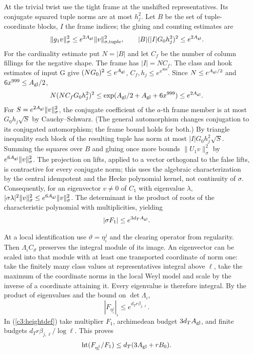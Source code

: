 At the trivial twist use the tight frame at the unshifted
representatives. Its conjugate squared tuple norms are at most
$h_j^2$. Let $B$ be the set of tuple-coordinate blocks, $I$ the
frame indices; the gluing and counting estimates are
\[
 \|g_1 v\|_\sigma^2\le e^{2A_{\rm gl}}\|v\|_{\sigma,\mathrm{tuple}}^2,\qquad
 |B|(|I|G_0 h_j^2)^2\le e^{2A_{\rm gl}}.
\]
For the cardinality estimate put $N=|B|$ and let $C_f$ be the
number of column fillings for the negative shape. The frame has
$|I|=NC_f$. The class and hook estimates of input G give
$(NG_0)^2\le e^{A_{\rm gl}}$, $C_f,h_j\le e^{x^{999}}$. Since
$N\le e^{A_{\rm gl}/2}$ and $6x^{999}\le A_{\rm gl}/2$,
\[
 N(NC_fG_0h_j^2)^2\le
    \exp(A_{\rm gl}/2+A_{\rm gl}+6x^{999})\le e^{2A_{\rm gl}}.
\]
For $S=e^{2A_{\rm gl}}\|v\|_\sigma^2$, the conjugate coefficient of the
$a$-th frame member is at most $G_0h_j\sqrt S$ by Cauchy--Schwarz.
(The general automorphism changes conjugation to its conjugated
automorphism; the frame bound holds for both.) By triangle inequality
each block of the resulting tuple has norm at most
$|I|G_0 h_j^2\sqrt S$. Summing the squares over $B$ and gluing once
more bounds $\|U_1 v\|_\sigma^2$ by $e^{6A_{\rm gl}}\|v\|_\sigma^2$.
The projection on lifts, applied to a vector orthogonal to the false
lifts, is contractive for every conjugate norm; this uses the
algebraic characterization by the central idempotent and the
Hecke polynomial kernel, not continuity of $\sigma$.
Consequently, for an eigenvector $v\ne0$ of $C_1$ with eigenvalue
$\lambda$, $|\sigma\lambda|^2\|v\|_\sigma^2\le
e^{6A_{\rm gl}}\|v\|_\sigma^2$. The determinant is the product of roots
of the characteristic polynomial with multiplicities, yielding
\[
 |\sigma F_1|\le e^{3d_T A_{\rm gl}}.
\]

At a local identification use $\vartheta=\eta_\iota^j$ and
the clearing operator from regularity. Then $\Lambda_\iota
C_\vartheta$ preserves the integral module of its image. An
eigenvector can be scaled into that module with at least one
transported coordinate of norm one: take the finitely many class
values at representatives integral above $\ell$, take the maximum
of the coordinate norms in the local Weyl model and scale by the
inverse of a coordinate attaining it. Every eigenvalue is therefore
integral. By the product of eigenvalues and the bound on
$\det\Lambda_\iota$,
\[
 |F_{\eta_\iota^j}|_\iota\le e^{d_T r\beta_{j,\ell}}.
\]
In (\ref{c3:heightdef}) take multiplier $F_1$, archimedean budget
$3d_T A_{\rm gl}$, and finite budgets $d_T r\beta_{j,\ell}/\log\ell$.
This proves
\begin{equation}\label{c3:compressionheight}
 \operatorname{ht}(F_{\eta_\iota^j}/F_1)
 \le d_T(3A_{\rm gl}+rB_0).
\end{equation}

